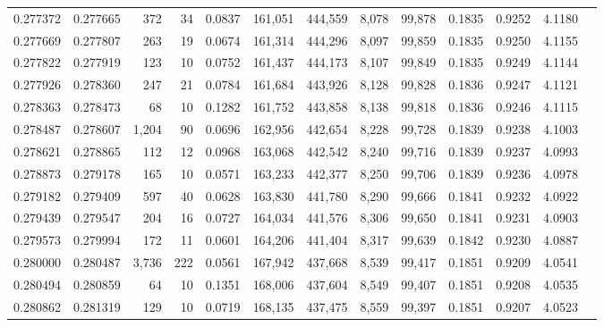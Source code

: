 \begin{tabular}{rrrrrrrrrrrrr}
0.277372 & 0.277665 &   372 &  34 &                                     0.0837 & 161,051 & 444,559 &   8,078 &  99,878 & 0.1835 & 0.9252 & 4.1180 \\
0.277669 & 0.277807 &   263 &  19 &                                     0.0674 & 161,314 & 444,296 &   8,097 &  99,859 & 0.1835 & 0.9250 & 4.1155 \\
0.277822 & 0.277919 &   123 &  10 &                                     0.0752 & 161,437 & 444,173 &   8,107 &  99,849 & 0.1835 & 0.9249 & 4.1144 \\
0.277926 & 0.278360 &   247 &  21 &                                     0.0784 & 161,684 & 443,926 &   8,128 &  99,828 & 0.1836 & 0.9247 & 4.1121 \\
0.278363 & 0.278473 &    68 &  10 &                                     0.1282 & 161,752 & 443,858 &   8,138 &  99,818 & 0.1836 & 0.9246 & 4.1115 \\
0.278487 & 0.278607 & 1,204 &  90 &                                     0.0696 & 162,956 & 442,654 &   8,228 &  99,728 & 0.1839 & 0.9238 & 4.1003 \\
0.278621 & 0.278865 &   112 &  12 &                                     0.0968 & 163,068 & 442,542 &   8,240 &  99,716 & 0.1839 & 0.9237 & 4.0993 \\
0.278873 & 0.279178 &   165 &  10 &                                     0.0571 & 163,233 & 442,377 &   8,250 &  99,706 & 0.1839 & 0.9236 & 4.0978 \\
0.279182 & 0.279409 &   597 &  40 &                                     0.0628 & 163,830 & 441,780 &   8,290 &  99,666 & 0.1841 & 0.9232 & 4.0922 \\
0.279439 & 0.279547 &   204 &  16 &                                     0.0727 & 164,034 & 441,576 &   8,306 &  99,650 & 0.1841 & 0.9231 & 4.0903 \\
0.279573 & 0.279994 &   172 &  11 &                                     0.0601 & 164,206 & 441,404 &   8,317 &  99,639 & 0.1842 & 0.9230 & 4.0887 \\
0.280000 & 0.280487 & 3,736 & 222 &                                     0.0561 & 167,942 & 437,668 &   8,539 &  99,417 & 0.1851 & 0.9209 & 4.0541 \\
0.280494 & 0.280859 &    64 &  10 &                                     0.1351 & 168,006 & 437,604 &   8,549 &  99,407 & 0.1851 & 0.9208 & 4.0535 \\
0.280862 & 0.281319 &   129 &  10 &                                     0.0719 & 168,135 & 437,475 &   8,559 &  99,397 & 0.1851 & 0.9207 & 4.0523 \\

\end{tabular}
